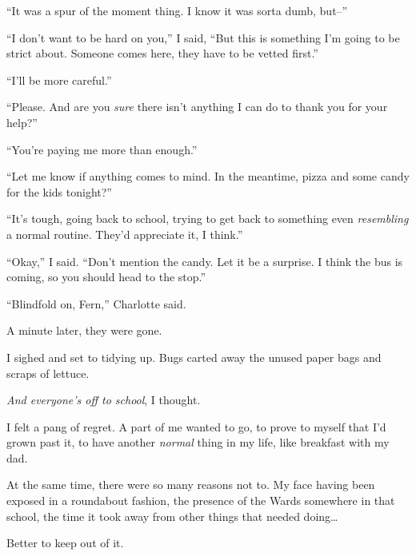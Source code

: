 ``It was a spur of the moment thing.  I know it was sorta dumb, but--''



``I don't want to be hard on you,'' I said, ``But this is something I'm going to be strict about.  Someone comes here, they have to be vetted first.''



``I'll be more careful.''



``Please.  And are you \emph{sure} there isn't anything I can do to thank you for your help?''



``You're paying me more than enough.''



``Let me know if anything comes to mind.  In the meantime, pizza and some candy for the kids tonight?''



``It's tough, going back to school, trying to get back to something even \emph{resembling} a normal routine.  They'd appreciate it, I think.''



``Okay,'' I said.  ``Don't mention the candy.  Let it be a surprise.  I think the bus is coming, so you should head to the stop.''



``Blindfold on, Fern,'' Charlotte said.



A minute later, they were gone.



I sighed and set to tidying up.  Bugs carted away the unused paper bags and scraps of lettuce.



\emph{And everyone's off to school}, I thought.



I felt a pang of regret.  A part of me wanted to go, to prove to myself that I'd grown past it, to have another \emph{normal} thing in my life, like breakfast with my dad.



At the same time, there were so many reasons not to.  My face having been exposed in a roundabout fashion, the presence of the Wards somewhere in that school, the time it took away from other things that needed doing\ldots



Better to keep out of it.



